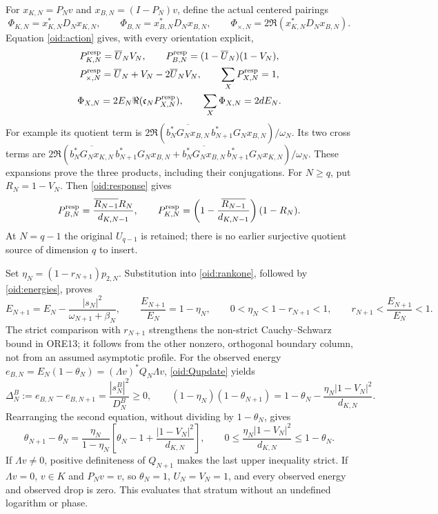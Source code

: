 \documentclass[11pt,a4paper]{article}
\begin{document}
For $x_{K,N}=P_Nv$ and $x_{B,N}=(I-P_N)v$, define the actual
centered pairings
\[
 \Phi_{K,N}=x_{K,N}^*D_Nx_{K,N},\qquad
 \Phi_{B,N}=x_{B,N}^*D_Nx_{B,N},\qquad
 \Phi_{\times,N}=2\Re(x_{K,N}^*D_Nx_{B,N}).
\]
Equation \eqref{oid:action} gives, with every orientation explicit,
\begin{equation}\label{oid:products}
\begin{gathered}
 P_{K,N}^{\rm resp}=\overline U_NV_N,\qquad
 P_{B,N}^{\rm resp}=(1-\overline U_N)(1-V_N),\\
 P_{\times,N}^{\rm resp}=\overline U_N+V_N-2\overline U_NV_N,
 \qquad \sum_XP_{X,N}^{\rm resp}=1,\\
 \Phi_{X,N}=2E_N\Re(\mathfrak c_NP_{X,N}^{\rm resp}),\qquad
 \sum_X\Phi_{X,N}=2dE_N.
\end{gathered}
\end{equation}
For example its quotient term is
$2\Re(\overline{b_N^*G_Nx_{B,N}}\,
b_{N+1}^*G_Nx_{B,N})/\omega_N$. Its two cross terms are
$2\Re(\overline{b_N^*G_Nx_{K,N}}\,b_{N+1}^*G_Nx_{B,N}
+\overline{b_N^*G_Nx_{B,N}}\,b_{N+1}^*G_Nx_{K,N})/\omega_N$.
These expansions prove the three products, including their conjugations.
For $N\ge q$, put $R_N=1-V_N$. Then \eqref{oid:response} gives
\begin{equation}\label{oid:consecutiveproducts}
 P_{B,N}^{\rm resp}
 =\frac{\overline{R_{N-1}}R_N}{d_{K,N-1}},\qquad
 P_{K,N}^{\rm resp}
 =\left(1-\frac{\overline{R_{N-1}}}{d_{K,N-1}}\right)(1-R_N).
\end{equation}
At $N=q-1$ the original $U_{q-1}$ is retained; there is no earlier
surjective quotient source of dimension $q$ to insert.

Set $\eta_N=(1-r_{N+1})p_{2,N}$. Substitution into
\eqref{oid:rankone}, followed by \eqref{oid:energies}, proves
\begin{equation}\label{oid:Eloss}
 E_{N+1}=E_N-\frac{|s_N|^2}{\omega_{N+1}+\beta_N},\qquad
 \frac{E_{N+1}}{E_N}=1-\eta_N,
 \qquad 0<\eta_N<1-r_{N+1}<1,
 \qquad r_{N+1}<\frac{E_{N+1}}{E_N}<1.
\end{equation}
The strict comparison with $r_{N+1}$ strengthens the non-strict
Cauchy--Schwarz bound in ORE13; it follows from the other nonzero,
orthogonal boundary column, not from an assumed asymptotic profile.
For the observed energy
$e_{B,N}=E_N(1-\theta_N)=(\Lambda v)^*Q_N\Lambda v$,
\eqref{oid:Qupdate} yields
\begin{equation}\label{oid:observedloss}
 \Delta_N^B:=e_{B,N}-e_{B,N+1}
 =\frac{|s_N^B|^2}{D_N^B}\ge0,
 \qquad
 (1-\eta_N)(1-\theta_{N+1})
 =1-\theta_N-\frac{\eta_N|1-V_N|^2}{d_{K,N}}.
\end{equation}
Rearranging the second equation, without dividing by $1-\theta_N$,
gives
\begin{equation}\label{oid:theta}
 \theta_{N+1}-\theta_N
 =\frac{\eta_N}{1-\eta_N}
 \left[\theta_N-1+\frac{|1-V_N|^2}{d_{K,N}}\right],\qquad
 0\le\frac{\eta_N|1-V_N|^2}{d_{K,N}}\le1-\theta_N.
\end{equation}
If $\Lambda v\ne0$, positive definiteness of $Q_{N+1}$ makes the
last upper inequality strict. If $\Lambda v=0$, $v\in K$ and
$P_Nv=v$, so $\theta_N=1$, $U_N=V_N=1$, and every observed
energy and observed drop is zero. This evaluates that stratum without
an undefined logarithm or phase.
\end{document}
